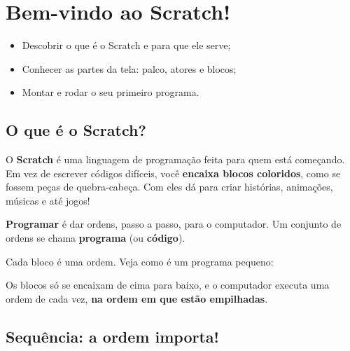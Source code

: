 \chapter{Bem-vindo ao Scratch!}

\begin{objetivos}
\begin{itemize}
\item Descobrir o que é o Scratch e para que ele serve;
\item Conhecer as partes da tela: palco, atores e blocos;
\item Montar e rodar o seu primeiro programa.
\end{itemize}
\end{objetivos}

\section{O que é o Scratch?}

O \textbf{Scratch} é uma linguagem de programação feita para quem está começando. Em vez de escrever códigos difíceis, você \textbf{encaixa blocos coloridos}, como se fossem peças de quebra-cabeça. Com eles dá para criar histórias, animações, músicas e até jogos!

\begin{vocabulario}
\textbf{Programar} é dar ordens, passo a passo, para o computador. Um conjunto de ordens se chama \textbf{programa} (ou \textbf{código}).
\end{vocabulario}

Cada bloco é uma ordem. Veja como é um programa pequeno:

\begin{codigo}
\begin{pilha}
\end{pilha}
\end{codigo}

\begin{dica}
Os blocos só se encaixam de cima para baixo, e o computador executa uma ordem de cada vez, \textbf{na ordem em que estão empilhadas}.
\end{dica}

\section{Sequência: a ordem importa!}

